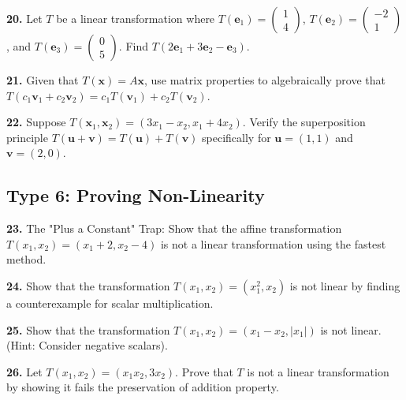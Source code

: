 \documentclass{article}
\begin{document}
\vspace{0.3cm}
\textbf{20.} Let $T$ be a linear transformation where $T(\mathbf{e}_1) = \begin{pmatrix} 1 \\ 4 \end{pmatrix}$, $T(\mathbf{e}_2) = \begin{pmatrix} -2 \\ 1 \end{pmatrix}$, and $T(\mathbf{e}_3) = \begin{pmatrix} 0 \\ 5 \end{pmatrix}$. Find $T(2\mathbf{e}_1 + 3\mathbf{e}_2 - \mathbf{e}_3)$.

\vspace{0.3cm}
\textbf{21.} Given that $T(\mathbf{x}) = A\mathbf{x}$, use matrix properties to algebraically prove that $T(c_1\mathbf{v}_1 + c_2\mathbf{v}_2) = c_1T(\mathbf{v}_1) + c_2T(\mathbf{v}_2)$.

\vspace{0.3cm}
\textbf{22.} Suppose $T(\mathbf{x}_1, \mathbf{x}_2) = (3x_1 - x_2, x_1 + 4x_2)$. Verify the superposition principle $T(\mathbf{u} + \mathbf{v}) = T(\mathbf{u}) + T(\mathbf{v})$ specifically for $\mathbf{u} = (1, 1)$ and $\mathbf{v} = (2, 0)$.

\subsection*{Type 6: Proving Non-Linearity}
\textbf{23.} The "Plus a Constant" Trap: Show that the affine transformation $T(x_1, x_2) = (x_1 + 2, x_2 - 4)$ is not a linear transformation using the fastest method.

\vspace{0.3cm}
\textbf{24.} Show that the transformation $T(x_1, x_2) = (x_1^2, x_2)$ is not linear by finding a counterexample for scalar multiplication.

\vspace{0.3cm}
\textbf{25.} Show that the transformation $T(x_1, x_2) = (x_1 - x_2, |x_1|)$ is not linear. (Hint: Consider negative scalars).

\vspace{0.3cm}
\textbf{26.} Let $T(x_1, x_2) = (x_1 x_2, 3x_2)$. Prove that $T$ is not a linear transformation by showing it fails the preservation of addition property.
\end{document}
